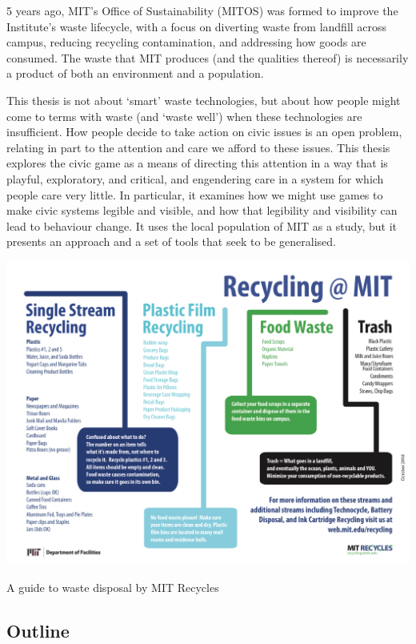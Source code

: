 \documentclass[nofonts,nols,justified,nobib]{tufte-book}
\begin{document}
5 years ago, MIT's Office of Sustainability (MITOS) was formed to improve the Institute's waste lifecycle, with a focus on diverting waste from landfill across campus, reducing recycling contamination, and addressing how goods are consumed. The waste that MIT produces (and the qualities thereof) is necessarily a product of both an environment and a population.

This thesis is not about `smart' waste technologies, but about how people might come to terms with waste (and `waste well') when these technologies are insufficient. How people decide to take action on civic issues is an open problem, relating in part to the attention and care we afford to these issues. This thesis explores the civic game as a means of directing this attention in a way that is playful, exploratory, and critical, and engendering care in a system for which people care very little. In particular, it examines how we might use games to make civic systems legible and visible, and how that legibility and visibility can lead to behaviour change. It uses the local population of MIT as a study, but it presents an approach and a set of tools that seek to be generalised.


\begin{marginfigure}
\includegraphics[width=\textwidth]{img/1/flowchart.png}
\caption{A guide to waste disposal by MIT Recycles \label{b}}
\end{marginfigure}

\subsection*{Outline}
\end{document}
